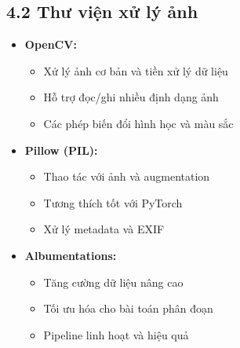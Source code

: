 \documentclass[12pt]{report}
\begin{document}
\subsection*{4.2 Thư viện xử lý ảnh}
\begin{itemize}
    \item \textbf{OpenCV:}
        \begin{itemize}
            \item Xử lý ảnh cơ bản và tiền xử lý dữ liệu
            \item Hỗ trợ đọc/ghi nhiều định dạng ảnh
            \item Các phép biến đổi hình học và màu sắc
        \end{itemize}
    \item \textbf{Pillow (PIL):}
        \begin{itemize}
            \item Thao tác với ảnh và augmentation
            \item Tương thích tốt với PyTorch
            \item Xử lý metadata và EXIF
        \end{itemize}
    \item \textbf{Albumentations:}
        \begin{itemize}
            \item Tăng cường dữ liệu nâng cao
            \item Tối ưu hóa cho bài toán phân đoạn
            \item Pipeline linh hoạt và hiệu quả
        \end{itemize}
\end{itemize}
\end{document}
